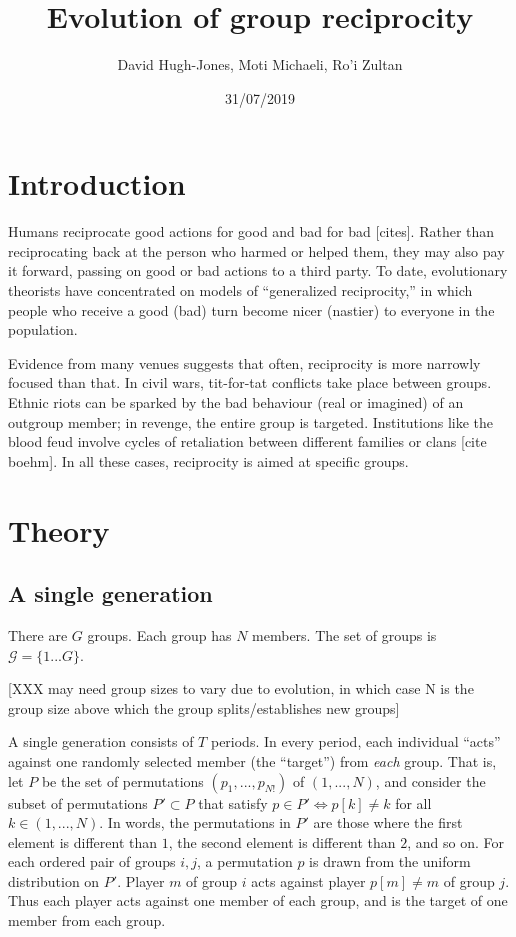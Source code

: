 \documentclass[
]{article}
\title{Evolution of group reciprocity}
\author{David Hugh-Jones, Moti Michaeli, Ro'i Zultan}
\date{31/07/2019}
\begin{document}
\maketitle

\hypertarget{introduction}{%
\section{Introduction}\label{introduction}}

Humans reciprocate good actions for good and bad for bad {[}cites{]}.
Rather than reciprocating back at the person who harmed or helped them,
they may also pay it forward, passing on good or bad actions to a third
party. To date, evolutionary theorists have concentrated on models of
``generalized reciprocity,'' in which people who receive a good (bad)
turn become nicer (nastier) to everyone in the population.

Evidence from many venues suggests that often, reciprocity is more
narrowly focused than that. In civil wars, tit-for-tat conflicts take
place between groups. Ethnic riots can be sparked by the bad behaviour
(real or imagined) of an outgroup member; in revenge, the entire group
is targeted. Institutions like the blood feud involve cycles of
retaliation between different families or clans {[}cite boehm{]}. In all
these cases, reciprocity is aimed at specific groups.

\hypertarget{theory}{%
\section{Theory}\label{theory}}

\hypertarget{a-single-generation}{%
\subsection{A single generation}\label{a-single-generation}}

There are \(G\) groups. Each group has \(N\) members. The set of groups
is \(\mathcal{G} = \{1 ... G\}\).

{[}XXX may need group sizes to vary due to evolution, in which case N is
the group size above which the group splits/establishes new groups{]}

A single generation consists of \(T\) periods. In every period, each
individual ``acts'' against one randomly selected member (the
``target'') from \emph{each} group. That is, let \(P\) be the set of
permutations \((p_1, ..., p_{N!})\) of \((1, ..., N)\),
and consider the subset of permutations $P'\subset P$ that satisfy
\(p \in P' \Longleftrightarrow p[k] \ne k\) for all \(k \in (1, ..., N)\). 
In words, the permutations in $P'$ are those where the first element is different than $1$, the second element is different than $2$, and so on.
For each ordered pair of groups \(i, j\), a
permutation \(p\) is drawn from the uniform distribution on \(P'\).
Player \(m\) of group \(i\) acts against player \(p[m] \ne m\) of group \(j\).
Thus each player acts against one member of each group, and is the
target of one member from each group.
\end{document}
